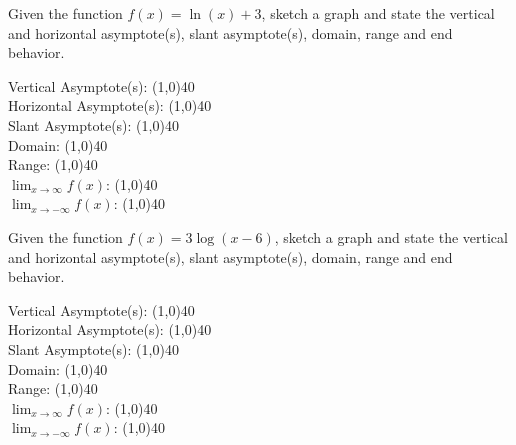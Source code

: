 \documentclass[addpoints]{exam}
\begin{document}
\begin{questions}
    \newpage
    \question[1] Given the function $f(x) = \ln(x) + 3$, sketch a graph and state the vertical and horizontal asymptote(s), slant asymptote(s), domain, range and end behavior.
    
        \begin{left} 
        \end{left}
    
    Vertical Asymptote(s): \line(1,0){40} \\
    \newline
    Horizontal Asymptote(s): \line(1,0){40} \\
    \newline
    Slant Asymptote(s): \line(1,0){40} \\
    \newline
    Domain: \line(1,0){40} \\
    \newline
    Range: \line(1,0){40} \\
    \newline
    $\lim_{x\to\infty} f(x)$: \line(1,0){40} \\
    \newline
    $\lim_{x\to-\infty} f(x)$: \line(1,0){40} \\
    
    \question[1] Given the function $f(x) = 3\log(x-6)$, sketch a graph and state the vertical and horizontal asymptote(s), slant asymptote(s), domain, range and end behavior.
    
        \begin{left} 
        \end{left}
    
    Vertical Asymptote(s): \line(1,0){40} \\
    \newline
    Horizontal Asymptote(s): \line(1,0){40} \\
    \newline
    Slant Asymptote(s): \line(1,0){40} \\
    \newline
    Domain: \line(1,0){40} \\
    \newline
    Range: \line(1,0){40} \\
    \newline
    $\lim_{x\to\infty} f(x)$: \line(1,0){40} \\
    \newline
    $\lim_{x\to-\infty} f(x)$: \line(1,0){40} \\
    

\end{questions}
\end{document}
